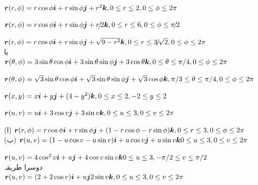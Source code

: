 \begin {description}\setlength {\parskip }{0pt} \setlength {\itemsep }{0pt plus 1pt}
\item [
\protect ۱)
]
 \({{\boldsymbol{r}}}(r,\phi )=r\cos \phi {\boldsymbol{i}} +r\sin \phi {\boldsymbol{j}} +r^2{\boldsymbol{k}} ,\\ 0\le r\le 2, 0\le \phi \le 2\pi \) 
\item [
\protect ۳)
]
 \({{\boldsymbol{r}}}(r,\phi )=r\cos \phi {\boldsymbol{i}} +r\sin \phi {\boldsymbol{j}} +r\!/\!2{\boldsymbol{k}} ,\\ 0\le r\le 6,0\le \phi \le \pi \!/\!2\) 
\item [
\protect ۵)
]
 \({{\boldsymbol{r}}}(r,\phi )=r\cos \phi {\boldsymbol{i}} +r\sin \phi {\boldsymbol{j}} +\\ \sqrt {9-r^2}{\boldsymbol{k}} , 0\le r\le 3\!/\!\sqrt {2},0\le \phi \le 2\pi \)\\ یا\\ \({{\boldsymbol{r}}}(\theta ,\phi )=3\sin \theta \cos \phi {\boldsymbol{i}} +3\sin \theta \sin \phi {\boldsymbol{j}} +3\cos \theta {\boldsymbol{k}} ,\\ 0\le \theta \le \pi /4, 0\le \phi \le 2\pi \) 
\item [
\protect ۷)
]
 \({{\boldsymbol{r}}}(\theta ,\phi )=\sqrt {3}\sin \theta \cos \phi {\boldsymbol{i}} +\sqrt {3}\sin \theta \sin \phi {\boldsymbol{j}} +\sqrt {3}\cos \phi {\boldsymbol{k}} ,\\ \pi /3\le \theta \le \pi /4,0\le \phi \le 2\pi \) 
\item [
\protect ۹)
]
 \({{\boldsymbol{r}}}(x,y)=x{\boldsymbol{i}} +y{\boldsymbol{j}} +(4-y^2){\boldsymbol{k}} ,\\ 0\le x\le 2,-2\le y\le 2\) 
\item [
\protect ۱۱)
]
 \({{\boldsymbol{r}}}(u,v)= u{\boldsymbol{i}} +3\cos v{\boldsymbol{j}} +3\sin v{\boldsymbol{k}} ,\\ 0\le u\le 3, 0\le v\le 2\pi \) 
\item [
\protect ۱۳)
]
 (ا) \({{\boldsymbol{r}}}(r,\phi )=r\cos \phi {\boldsymbol{i}} +r\sin \phi {\boldsymbol{j}} +\\(1-r\cos \phi -r\sin \phi ){\boldsymbol{k}} ,\\ 0\le r\le 3, 0\le \phi \le 2\pi \)\\ (ب) \({{\boldsymbol{r}}}(u,v)=(1-u\cos v-u\sin v){\boldsymbol{i}} \\+u\cos v{\boldsymbol{j}} +u\sin v{\boldsymbol{k}} \\ 0\le u\le 3, 0\le v\le 2\pi \) 
\item [
\protect ۱۵)
]
 \({{\boldsymbol{r}}}(u,v)=4\cos ^2 v{\boldsymbol{i}} +u{\boldsymbol{j}} +4\cos v\sin v{\boldsymbol{k}} \\ 0\le u\le 3, -\pi /2\le v\le \pi /2\)\\ دوسرا طریقہ\\ \({{\boldsymbol{r}}}(u,v)=(2+2\cos v){\boldsymbol{i}} +u{\boldsymbol{j}} \\ 2\sin v{\boldsymbol{k}} , 0\le u\le 3,0\le v\le 2\pi \) 

\end{description}
